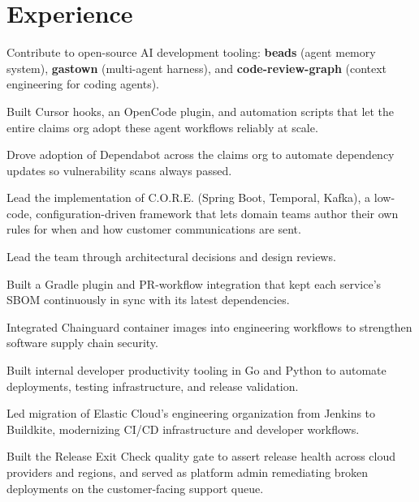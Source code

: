 \documentclass[letterpaper]{resume} %
\begin{document}
\begin{minipage}[t]{0.66\textwidth} %


\section{Experience}

\vspace{\topsep} %
\begin{tightitemize}
    \item Contribute to open-source AI development tooling: \textbf{beads} (agent memory system), \textbf{gastown} (multi-agent harness), and \textbf{code-review-graph} (context engineering for coding agents).
    \item Built Cursor hooks, an OpenCode plugin, and automation scripts that let the entire claims org adopt these agent workflows reliably at scale.
    \item Drove adoption of Dependabot across the claims org to automate dependency updates so vulnerability scans always passed.
    \item Lead the implementation of C.O.R.E. (Spring Boot, Temporal, Kafka), a low-code, configuration-driven framework that lets domain teams author their own rules for when and how customer communications are sent.
    \item Lead the team through architectural decisions and design reviews.
\end{tightitemize}

\begin{tightitemize}
    \item Built a Gradle plugin and PR-workflow integration that kept each service's SBOM continuously in sync with its latest dependencies.
    \item Integrated Chainguard container images into engineering workflows to strengthen software supply chain security.
    \item Built internal developer productivity tooling in Go and Python to automate deployments, testing infrastructure, and release validation.
    \item Led migration of Elastic Cloud's engineering organization from Jenkins to Buildkite, modernizing CI/CD infrastructure and developer workflows.
    \item Built the Release Exit Check quality gate to assert release health across cloud providers and regions, and served as platform admin remediating broken deployments on the customer-facing support queue.
\end{tightitemize}%


\end{minipage}
\end{document}

